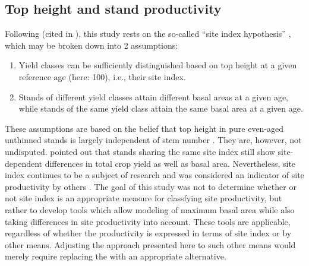 \subsection{Top height and stand productivity}

Following \textcite{Baur1881} (cited in \textcite[p. 159]{Assmann1970}), this study rests on the so-called ``site index hypothesis'' \parencite{Skovsgaard2008}, which may be broken down into 2 assumptions:
\begin{enumerate}
\item Yield classes can be sufficiently distinguished based on top height at a given reference age (here: \SI{100}{\year}), i.e., their site index.
\item Stands of different yield classes attain different basal areas at a given age, while stands of the same yield class attain the same basal area at a given age.
\end{enumerate}
These assumptions are based on the belief that top height in pure even-aged unthinned stands is largely independent of stem number \parencite{Skovsgaard2008}.  
They are, however, not undisputed.  \textcite{Assmann1970} pointed out that stands sharing the same site index still show site-dependent differences in total crop yield as well as basal area.  Nevertheless, site index continues to be a subject of research \parencite{Weiskittel2011,Somarriba2001,Wang2005} and was considered an indicator of site productivity by others \parencite{Monserud1984,Rayner1992,Karlsson1997}.  The goal of this study was not to determine whether or not site index is an appropriate measure for classfying site productivity, but rather to develop tools which allow modeling of maximum basal area while also taking differences in site productivity into account.  These tools are applicable, regardless of whether the productivity is expressed in terms of site index or by other means.  Adjusting the approach presented here to such other means would merely require replacing the \ProductivityIndexVariableText{} with an appropriate alternative.

